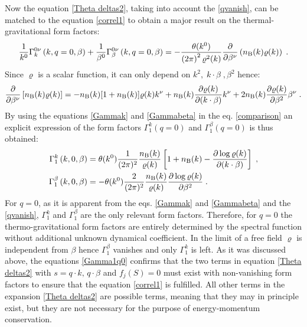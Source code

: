 \documentclass[prd,superscriptaddress,nofootinbib,notitlepage]{revtex4-1}
\begin{document}
Now the equation \eqref{Theta deltas2}, taking into account the \eqref{qvanish}, can be matched to the equation 
\eqref{correl1} to obtain a major result on the thermal-gravitational form factors:
%
\begin{equation}\label{comparison}
    \frac{1}{k^0}\Gamma^{0\nu}_k\left(k,q=0,\beta\right) +\frac{1}{\beta^0}
    \Gamma^{0\nu}_\beta\left(k,q=0,\beta\right)=-\frac{\theta(k^0)}{\left(2\pi\right)^2\varrho^2(k)}
    \frac{\partial}{\partial\beta^\nu}\left(n_{\rm B}(k)\varrho(k)\right)\;.
\end{equation}
%
Since $\varrho$ is a scalar function, it can only depend on $k^2,\;k\cdot\beta\;,\beta^2$ hence:
%
\begin{equation*}
    \frac{\partial}{\partial\beta^\nu}\left[n_{\rm B}(k)\varrho(k)\right] = - n_{\rm B}(k)[1+n_{\rm B}(k)] \varrho(k)
    k^\nu + n_{\rm B}(k) \frac{\partial \varrho(k)}{\partial (k \cdot \beta)} k^\nu + 2 n_{\rm B}(k) 
    \frac{\partial \varrho(k)}{\partial \beta^2} \beta^\nu\;.
\end{equation*}
%
By using the equations \eqref{Gammak} and \eqref{Gammabeta} in the eq. \eqref{comparison} an explicit expression 
of the form factors $\Gamma_1^k(q=0)$ and $\Gamma_1^\beta(q=0)$ is thus obtained:
%
\begin{subequations}\label{Gamma1q0}
\begin{align}
    \Gamma_1^k\left(k,0,\beta\right)&=\theta(k^0) \frac{1}{(2\pi)^2} \frac{n_{\rm B}(k)}{\varrho(k)} \left[ 1+n_{\rm B}(k) 
    - \frac{\partial \log \varrho(k)}{\partial (k \cdot \beta)} \right]\;, \\
  \Gamma_1^\beta\left(k,0,\beta\right)&=- \theta(k^0) \frac{2}{(2\pi)^2} \frac{n_{\rm B}(k)}{\varrho(k)} 
  \frac{\partial \log \varrho(k)}{\partial \beta^2} \;.
\end{align}
\end{subequations}
%
For $q=0$, as it is apparent from the eqs. \eqref{Gammak} and \eqref{Gammabeta} and the \eqref{qvanish},
$\Gamma_1^k$ and $\Gamma_1^\beta$ are the only relevant form factors. Therefore, for $q=0$ the thermo-gravitational 
form factors are entirely determined by the spectral function without additional unknown dynamical coefficient.
In the limit of a free field $\varrho$ is independent from $\beta$ hence $\Gamma_1^\beta$ vanishes and only 
$\Gamma_1^k$ is left. As it was discussed above, the equations \eqref{Gamma1q0} confirms that the two terms in 
equation \eqref{Theta deltas2} with $s=q\cdot k,\, q\cdot \beta$ and $f_j(S)=0$ must exist with non-vanishing 
form factors to ensure that the equation \eqref{correl1} is fulfilled. All other terms in the expansion 
\eqref{Theta deltas2} are possible terms, meaning that they may in principle exist, but they are not necessary 
for the purpose of energy-momentum conservation.
\end{document}
